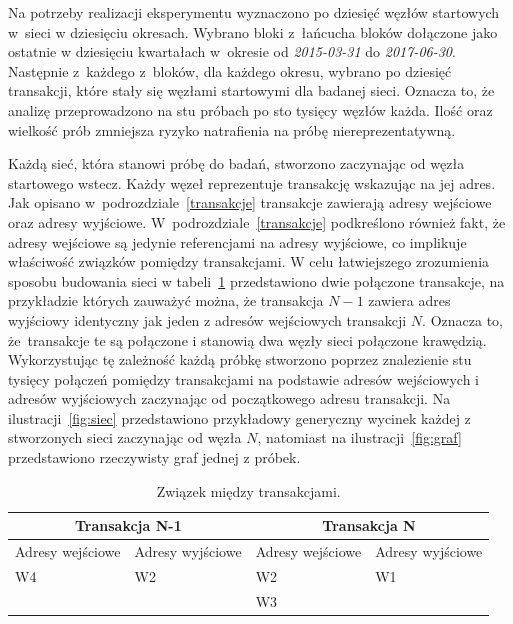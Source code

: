 \documentclass[12pt, oneside, final, openany]{mgr}
\begin{document}
\indent Na potrzeby realizacji eksperymentu wyznaczono po dziesięć węzłów startowych w~sieci w dziesięciu okresach. Wybrano bloki z~łańcucha bloków dołączone jako ostatnie w dziesięciu kwartałach w~okresie od \textit{2015-03-31} do \textit{2017-06-30}. Następnie z~każdego z~bloków, dla każdego okresu, wybrano po dziesięć transakcji, które stały się węzłami startowymi dla badanej sieci. Oznacza to, że analizę przeprowadzono na stu próbach po sto tysięcy węzłów każda. Ilość oraz wielkość prób zmniejsza ryzyko natrafienia na próbę niereprezentatywną.

\indent Każdą sieć, która stanowi próbę do badań, stworzono zaczynając od węzła startowego wstecz. Każdy węzeł reprezentuje transakcję wskazując na jej adres. Jak opisano w~podrozdziale~\ref{transakcje} transakcje zawierają adresy wejściowe oraz adresy wyjściowe. W~podrozdziale~\ref{transakcje} podkreślono również fakt, że adresy wejściowe są jedynie referencjami na adresy wyjściowe, co implikuje właściwość związków pomiędzy transakcjami. W celu łatwiejszego zrozumienia sposobu budowania sieci w tabeli~\ref{tab:zwiazekTransakcji} przedstawiono dwie połączone transakcje, na przykładzie których zauważyć można, że transakcja $N-1$ zawiera adres wyjściowy identyczny jak jeden z adresów wejściowych transakcji $N$. Oznacza to, że~transakcje te są połączone i stanowią dwa węzły sieci połączone krawędzią. Wykorzystując tę zależność każdą próbkę stworzono poprzez znalezienie stu tysięcy połączeń pomiędzy transakcjami na podstawie adresów wejściowych i adresów wyjściowych zaczynając od początkowego adresu transakcji. Na ilustracji~\ref{fig:siec} przedstawiono przykładowy generyczny wycinek każdej z stworzonych sieci zaczynając od węzła $N$, natomiast na ilustracji~\ref{fig:graf} przedstawiono rzeczywisty graf jednej z próbek. 

\begin{table}[H]
\begin{center}
\caption{Związek między transakcjami.}
\label{tab:zwiazekTransakcji}
\begin{tabular}{|l|l|l|l|}
\hline
	\multicolumn{2}{|c|}{Transakcja N-1} 
   &\multicolumn{2}{|c|}{Transakcja N}  \\
\hline
Adresy wejściowe & Adresy wyjściowe &Adresy wejściowe & Adresy wyjściowe\\
\hline
W4 & W2 & W2 & W1 \\
&& W3 & \\
\hline 
\end{tabular}
\end{center}
\end{table}
\end{document}
